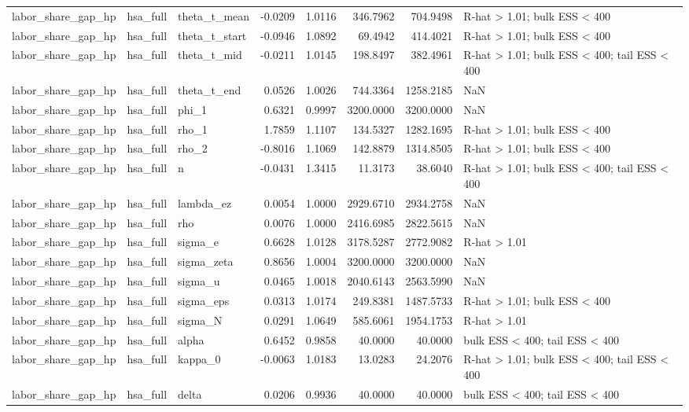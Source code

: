 \begin{tabular}{lllrrrrl}
labor\_share\_gap\_hp & hsa\_full & theta\_t\_mean & -0.0209 & 1.0116 & 346.7962 & 704.9498 & R-hat > 1.01; bulk ESS < 400 \\
labor\_share\_gap\_hp & hsa\_full & theta\_t\_start & -0.0946 & 1.0892 & 69.4942 & 414.4021 & R-hat > 1.01; bulk ESS < 400 \\
labor\_share\_gap\_hp & hsa\_full & theta\_t\_mid & -0.0211 & 1.0145 & 198.8497 & 382.4961 & R-hat > 1.01; bulk ESS < 400; tail ESS < 400 \\
labor\_share\_gap\_hp & hsa\_full & theta\_t\_end & 0.0526 & 1.0026 & 744.3364 & 1258.2185 & NaN \\
labor\_share\_gap\_hp & hsa\_full & phi\_1 & 0.6321 & 0.9997 & 3200.0000 & 3200.0000 & NaN \\
labor\_share\_gap\_hp & hsa\_full & rho\_1 & 1.7859 & 1.1107 & 134.5327 & 1282.1695 & R-hat > 1.01; bulk ESS < 400 \\
labor\_share\_gap\_hp & hsa\_full & rho\_2 & -0.8016 & 1.1069 & 142.8879 & 1314.8505 & R-hat > 1.01; bulk ESS < 400 \\
labor\_share\_gap\_hp & hsa\_full & n & -0.0431 & 1.3415 & 11.3173 & 38.6040 & R-hat > 1.01; bulk ESS < 400; tail ESS < 400 \\
labor\_share\_gap\_hp & hsa\_full & lambda\_ez & 0.0054 & 1.0000 & 2929.6710 & 2934.2758 & NaN \\
labor\_share\_gap\_hp & hsa\_full & rho & 0.0076 & 1.0000 & 2416.6985 & 2822.5615 & NaN \\
labor\_share\_gap\_hp & hsa\_full & sigma\_e & 0.6628 & 1.0128 & 3178.5287 & 2772.9082 & R-hat > 1.01 \\
labor\_share\_gap\_hp & hsa\_full & sigma\_zeta & 0.8656 & 1.0004 & 3200.0000 & 3200.0000 & NaN \\
labor\_share\_gap\_hp & hsa\_full & sigma\_u & 0.0465 & 1.0018 & 2040.6143 & 2563.5990 & NaN \\
labor\_share\_gap\_hp & hsa\_full & sigma\_eps & 0.0313 & 1.0174 & 249.8381 & 1487.5733 & R-hat > 1.01; bulk ESS < 400 \\
labor\_share\_gap\_hp & hsa\_full & sigma\_N & 0.0291 & 1.0649 & 585.6061 & 1954.1753 & R-hat > 1.01 \\
labor\_share\_gap\_hp & hsa\_full & alpha & 0.6452 & 0.9858 & 40.0000 & 40.0000 & bulk ESS < 400; tail ESS < 400 \\
labor\_share\_gap\_hp & hsa\_full & kappa\_0 & -0.0063 & 1.0183 & 13.0283 & 24.2076 & R-hat > 1.01; bulk ESS < 400; tail ESS < 400 \\
labor\_share\_gap\_hp & hsa\_full & delta & 0.0206 & 0.9936 & 40.0000 & 40.0000 & bulk ESS < 400; tail ESS < 400 \\

\end{tabular}
